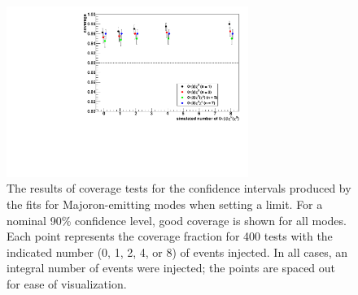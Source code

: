 \documentclass[herrin-thesis.tex]{subfiles}
\begin{document}
\begin{figure}[tbp]
\centering
\includegraphics[width=0.7\textwidth]{./plots/analysis_bb0nX_coverage.pdf}
\caption[Coverage tests for \zeronuXpX{}]{The results of coverage tests for the confidence intervals produced by the fits for Majoron-emitting modes when setting a limit. For a nominal 90\% confidence level, good coverage is shown for all modes. Each point represents the coverage fraction for 400 tests with the indicated number (0, 1, 2, 4, or 8) of \zeronuXpX{} events injected. In all cases, an integral number of events were injected; the points are spaced out for ease of visualization.}
\label{fig:analysis_bb0nX_coverage}
\end{figure}
\end{document}

